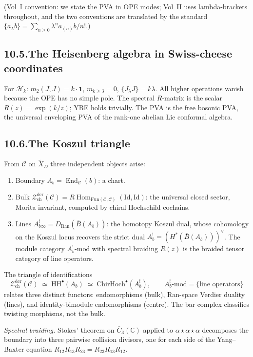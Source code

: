 \documentclass[11pt]{report}
\theoremstyle{definition}
\theoremstyle{remark}
\providecommand{\cC}{\mathcal{C}}
\providecommand{\cH}{\mathcal{H}}
\providecommand{\cZ}{\mathcal{Z}}
\providecommand{\barB}{\bar{B}}
\providecommand{\Ran}{\mathrm{Ran}}
\providecommand{\FM}{\overline{C}}
\providecommand{\Fun}{\mathrm{Fun}}
\providecommand{\Id}{\mathrm{Id}}
\providecommand{\der}{\mathrm{der}}
\providecommand{\HH}{\mathrm{HH}}
\providecommand{\bC}{\mathbb{C}}
\providecommand{\ch}{\mathrm{ch}}
\DeclareMathOperator{\End}{End}
\DeclareMathOperator{\Hom}{Hom}
\numberwithin{equation}{section}
\begin{document}
(Vol~I convention: we state the PVA in OPE modes; Vol~II uses
lambda-brackets throughout, and the two conventions are
translated by the standard
$\{a_\lambda b\} = \sum_{n \ge 0}\lambda^n a_{(n)}b/n!$.)

\subsection*{10.5.\enspace The Heisenberg algebra in Swiss-cheese coordinates}

For $\cH_k$: $m_2(J, J) = k \cdot \mathbf 1$,
$m_{k \ge 3} = 0$, $\{J_\lambda J\} = k\lambda$. All higher
operations vanish because the OPE has no simple pole. The
spectral $R$-matrix is the scalar $R(z) = \exp(k/z)$; YBE
holds trivially. The PVA is the free bosonic PVA, the
universal enveloping PVA of the rank-one abelian Lie conformal
algebra.

\subsection*{10.6.\enspace The Koszul triangle}

From $\cC$ on $\widetilde X_D$ three independent objects arise:
\begin{enumerate}[label=\textup{(\roman*)},nosep]
\item Boundary $A_b = \End_\cC(b)$: a chart.
\item Bulk $\cZ^{\der}_{\ch}(\cC) =
R\Hom_{\Fun(\cC,\cC)}(\Id, \Id)$: the universal closed sector, Morita
invariant, computed by chiral Hochschild cochains.
\item Lines
$A_b^!{}_\infty = D_{\Ran}(\barB(A_b))$: the homotopy Koszul
dual, whose cohomology on the Koszul locus recovers the strict
dual $A_b^! = (H^*(\barB(A_b)))^\vee$. The module category
$A_b^!\text{-mod}$ with spectral braiding $R(z)$ is the
braided tensor category of line operators.
\end{enumerate}
The triangle of identifications
\[
\cZ^{\der}_{\ch}(\cC)
\;\simeq\;
\HH^\bullet(A_b)
\;\simeq\;
\mathrm{ChirHoch}^\bullet(A_b^!),
\qquad
A_b^!\text{-mod} = \{\text{line operators}\}
\]
relates three distinct functors: endomorphisms (bulk),
Ran-space Verdier duality (lines), and identity-bimodule
endomorphisms (centre). The bar complex classifies twisting
morphisms, not the bulk.

\medskip\noindent\emph{Spectral braiding.} Stokes' theorem on
$\FM_3(\bC)$ applied to $\alpha\star\alpha\star\alpha$ decomposes
the boundary into three pairwise collision divisors, one for
each side of the Yang--Baxter equation
$R_{12}R_{13}R_{23} = R_{23}R_{13}R_{12}$.
\end{document}
